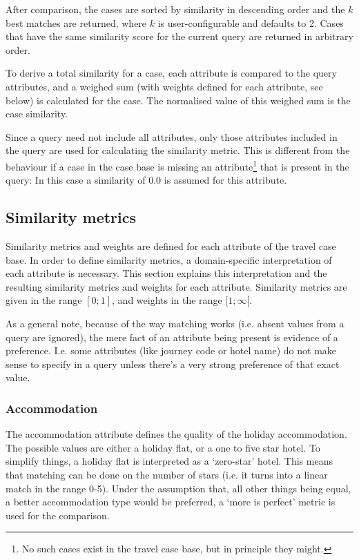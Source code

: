 \documentclass[a4paper,11pt]{scrartcl}
\begin{document}
After comparison, the cases are sorted by similarity in descending
order and the $k$ best matches are returned, where $k$ is
user-configurable and defaults to 2. Cases that have the same
similarity score for the current query are returned in arbitrary
order.

To derive a total similarity for a case, each attribute is compared to
the query attributes, and a weighed sum (with weights defined for each
attribute, see below) is calculated for the case. The normalised value
of this weighed sum is the case similarity.

Since a query need not include all attributes, only those attributes
included in the query are used for calculating the similarity metric.
This is different from the behaviour if a case in the case base is
missing an attribute\protect\footnote{No such cases exist in the
  travel case base, but in principle they might. } that is present in
the query: In this case a similarity of 0.0 is assumed for this
attribute.

\subsection{Similarity metrics}
Similarity metrics and weights are defined for each attribute of the
travel case base. In order to define similarity metrics, a
domain-specific interpretation of each attribute is necessary. This
section explains this interpretation and the resulting similarity
metrics and weights for each attribute. Similarity metrics are given
in the range $[0;1]$, and weights in the range $[1;\infty[$.

As a general note, because of the way matching works (i.e. absent
values from a query are ignored), the mere fact of an attribute being
present is evidence of a preference. I.e. some attributes (like
journey code or hotel name) do not make sense to specify in a query
unless there's a very strong preference of that exact value.

\subsubsection{Accommodation}
The accommodation attribute defines the quality of the holiday
accommodation. The possible values are either a holiday flat, or a one
to five star hotel. To simplify things, a holiday flat is interpreted
as a `zero-star' hotel. This means that matching can be done on the
number of stars (i.e. it turns into a linear match in the range 0-5).
Under the assumption that, all other things being equal, a better
accommodation type would be preferred, a `more is perfect' metric is
used for the comparison.
\end{document}
